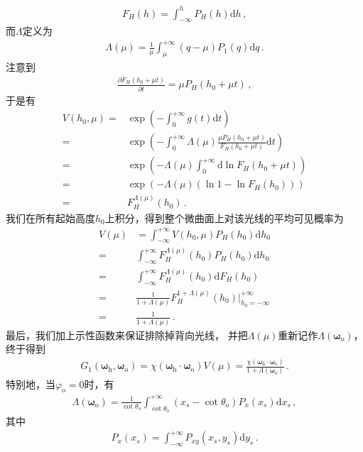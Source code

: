 \begin{align}
    F_H(h)=\int_{-\infty}^{h}P_H(h)\mathrm{d}h\, ,
\end{align}
而$\Lambda$定义为
\begin{align}
    \Lambda(\mu)=\frac{1}{\mu}\int_{\mu}^{+\infty}(q-\mu)P_1(q)\mathrm{d}q\, .
\end{align}
注意到
\begin{align}
    \frac{\partial F_H(h_0+\mu t)}{\partial t}=\mu P_H(h_0+\mu t)\, ,
\end{align}
于是有
\begin{align}
    V(h_0,\mu)=&\exp\left(-\int_{0}^{+\infty}g(t)\mathrm{d}t\right)\nonumber\\
    =&\exp\left(-\int_{0}^{+\infty}\Lambda(\mu)\frac{\mu P_H(h_0+\mu t)}{F_H(h_0+\mu t)}\mathrm{d}t\right)\nonumber\\
    =&\exp\left(-\Lambda(\mu)\int_{0}^{+\infty}\mathrm{d}\ln F_H(h_0+\mu t)\right)\nonumber\\
    =&\exp\left(-\Lambda(\mu)(\ln 1 - \ln F_H(h_0))\right)\nonumber\\
    =&F_H^{\Lambda(\mu)}(h_0)\, .
\end{align}
我们在所有起始高度$h_0$上积分，得到整个微曲面上对该光线的平均可见概率为
\begin{align}
    V(\mu)&=\int_{-\infty}^{+\infty}V(h_0,\mu)P_H(h_0)\mathrm{d}h_0\nonumber\\
    =&\int_{-\infty}^{+\infty}F_H^{\Lambda(\mu)}(h_0)P_H(h_0)\mathrm{d}h_0\nonumber\\
    =&\int_{-\infty}^{+\infty}F_H^{\Lambda(\mu)}(h_0)\mathrm{d}F_H(h_0)\nonumber\\
    =&\frac{1}{1+\Lambda(\mu)}F_H^{1+\Lambda(\mu)}(h_0)\bigg|_{h_0=-\infty}^{+\infty}\nonumber\\
    =&\frac{1}{1+\Lambda(\mu)}\, .
\end{align}
最后，我们加上示性函数来保证排除掉背向光线，
并把$\Lambda(\mu)$重新记作$\Lambda({\bm\omega}_{\mathrm{o}})$，终于得到
\begin{align}
    G_1({\bm\omega}_{\mathrm{h}},{\bm\omega}_{\mathrm{o}})
    =\chi({\bm\omega}_{\mathrm{h}}\cdot{\bm\omega}_{\mathrm{o}})V(\mu)
    =\frac{\chi({\bm\omega}_{\mathrm{h}}\cdot{\bm\omega}_{\mathrm{o}})}
    {1+\Lambda({\bm\omega}_{\mathrm{o}})}\, .
\end{align}
特别地，当$\varphi_{\mathrm{o}}=0$时，有
\begin{align}
    \Lambda({\bm\omega}_{\mathrm{o}})=\frac{1}{\cot\theta_{\mathrm{o}}}
    \int_{\cot\theta_{\mathrm{o}}}^{+\infty}(x_s-\cot\theta_{\mathrm{o}})P_x(x_s)\mathrm{d}x_s\, ,
\end{align}
其中
\begin{align}
    P_x(x_s)=\int_{-\infty}^{+\infty}P_{xy}(x_s,y_s)\mathrm{d}y_s\, .
\end{align}

